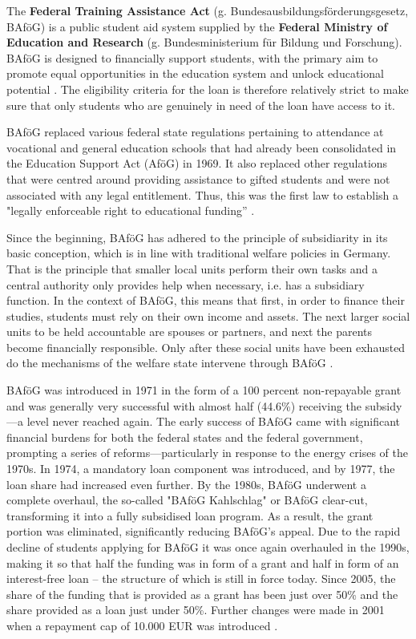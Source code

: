 The \textbf{Federal Training Assistance Act} (g. Bundesausbildungsförderungsgesetz, BAföG) is a public student aid system supplied by the \textbf{Federal Ministry of Education and Research} (g. Bundesministerium für Bildung und Forschung). BAföG is designed to financially support students, with the primary aim to promote equal opportunities in the education system and unlock educational potential \citep{meier_bafog_2024}. The eligibility criteria for the loan is therefore relatively strict to make sure that only students who are genuinely in need of the loan have access to it.

BAföG replaced various federal state regulations pertaining to attendance at vocational and general education schools that had already been consolidated in the Education Support Act (AföG) in 1969. It also replaced other regulations that were centred around providing assistance to gifted students and were not associated with any legal entitlement. Thus, this was the first law to establish a "legally enforceable right to educational funding” \citep{staack_von_2017}.

Since the beginning, BAföG has adhered to the principle of subsidiarity in its basic conception, which is in line with traditional welfare policies in Germany. That is the principle that smaller local units perform their own tasks and a central authority only provides help when necessary, i.e. has a subsidiary function. In the context of BAföG, this means that first, in order to finance their studies, students must rely on their own income and assets. The next larger social units to be held accountable are spouses or partners, and next the parents become financially responsible. Only after these social units have been exhausted do the mechanisms of the welfare state intervene through BAföG \citep{staack_von_2017}.

BAföG was introduced in 1971 in the form of a 100 percent non-repayable grant and was generally very successful with almost half (44.6\%) receiving the subsidy---a level never reached again. 
The early success of BAföG came with significant financial burdens for both the federal states and the federal government, prompting a series of reforms—particularly in response to the energy crises of the 1970s. In 1974, a mandatory loan component was introduced, and by 1977, the loan share had increased even further. By the 1980s, BAföG underwent a complete overhaul, the so-called "BAföG Kahlschlag" or BAföG clear-cut, transforming it into a fully subsidised loan program. As a result, the grant portion was eliminated, significantly reducing BAföG's appeal. Due to the rapid decline of students applying for BAföG it was once again overhauled in the 1990s, making it so that half the funding was in form of a grant and half in form of an interest-free loan -- the structure of which is still in force today. Since 2005, the share of the funding that is provided as a grant has been just over 50\% and the share provided as a loan just under 50\%. Further changes were made in 2001 when a repayment cap of 10.000 EUR was introduced  \citep{lost_geschichte_2025, staack_von_2017, meier_bafog_2024}.

